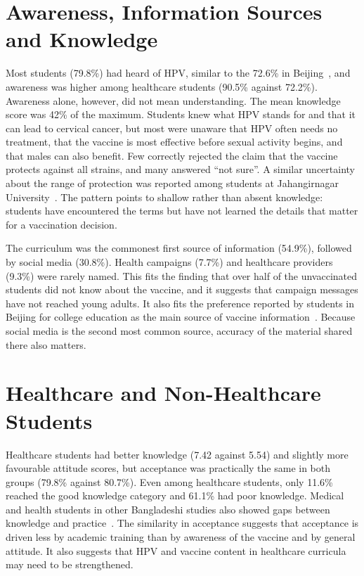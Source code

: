\section{Awareness, Information Sources and Knowledge}
Most students (79.8\%) had heard of HPV, similar to the 72.6\% in Beijing~\cite{liu2020}, and awareness was higher among healthcare students (90.5\% against 72.2\%). Awareness alone, however, did not mean understanding. The mean knowledge score was 42\% of the maximum. Students knew what HPV stands for and that it can lead to cervical cancer, but most were unaware that HPV often needs no treatment, that the vaccine is most effective before sexual activity begins, and that males can also benefit. Few correctly rejected the claim that the vaccine protects against all strains, and many answered ``not sure''. A similar uncertainty about the range of protection was reported among students at Jahangirnagar University~\cite{emon2025}. The pattern points to shallow rather than absent knowledge: students have encountered the terms but have not learned the details that matter for a vaccination decision.

The curriculum was the commonest first source of information (54.9\%), followed by social media (30.8\%). Health campaigns (7.7\%) and healthcare providers (9.3\%) were rarely named. This fits the finding that over half of the unvaccinated students did not know about the vaccine, and it suggests that campaign messages have not reached young adults. It also fits the preference reported by students in Beijing for college education as the main source of vaccine information~\cite{liu2020}. Because social media is the second most common source, accuracy of the material shared there also matters.

\section{Healthcare and Non-Healthcare Students}
Healthcare students had better knowledge (7.42 against 5.54) and slightly more favourable attitude scores, but acceptance was practically the same in both groups (79.8\% against 80.7\%). Even among healthcare students, only 11.6\% reached the good knowledge category and 61.1\% had poor knowledge. Medical and health students in other Bangladeshi studies also showed gaps between knowledge and practice~\cite{chowdhury2022,promi2025}. The similarity in acceptance suggests that acceptance is driven less by academic training than by awareness of the vaccine and by general attitude. It also suggests that HPV and vaccine content in healthcare curricula may need to be strengthened.

